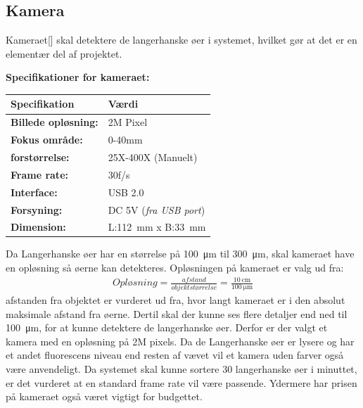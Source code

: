 \newpage
\subsection{Kamera}
\label{subsec:Kamera}
Kameraet[\citet{DH2}] skal detektere de langerhanske øer i systemet, hvilket gør at det er en elementær del af projektet.

\textbf{Specifikationer for kameraet:} 
\begin{center}
		\begin{longtable}{ | m{6.5cm} | m{6.5cm}| } 
			\hline
			\textbf{Specifikation} &\textbf{Værdi} \\ 
			\hline
			\textbf{Billede opløsning:} & 2M Pixel \\ 
			\hline
			\textbf{Fokus område:} & 0-40mm  \\ 
			\hline
			\textbf{forstørrelse:} & 25X-400X (Manuelt)  \\ 
			\hline
			\textbf{Frame rate:} & 30f/s  \\ 
			\hline
			\textbf{Interface:} & USB 2.0  \\ 
			\hline
			\textbf{Forsyning:} & DC 5V (\textit{fra USB port})  \\ 
			\hline
			\textbf{Dimension:} & L:\SI{112}{\milli\metre} x B:\SI{33}{\milli\metre}  \\ 
			\hline			
		\end{longtable}
		
	\end{center}
Da Langerhanske øer har en størrelse på \SI{100}{\micro\metre} til \SI{300}{\micro\metre}, skal kameraet have en opløsning så øerne kan detekteres. Opløsningen på kameraet er valg ud fra:
\begin{align}
Opløsning = \frac{afstand}{objektstørrelse} = \frac{\SI{10}{\centi\metre}}{\SI{100}{\micro\metre}} 
\end{align} \citep[s.5]{DH1}
afstanden fra objektet er vurderet ud fra, hvor langt kameraet er i den absolut maksimale afstand fra øerne. Dertil skal der kunne ses flere detaljer end ned til \SI{100}{\micro\metre}, for at kunne detektere de langerhanske øer. Derfor er der valgt et kamera med en opløsning på 2M pixels. Da de Langerhanske øer er lysere og har et andet fluorescens niveau end resten af vævet vil et kamera uden farver også være anvendeligt. Da systemet skal kunne sortere 30 langerhanske øer i minuttet, er det vurderet at en standard frame rate vil være passende. Ydermere har prisen på kameraet også været vigtigt for budgettet.



